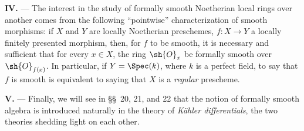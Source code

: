 \begin{env}[19.0.2]
\medskip\noindent\textbf{IV.} ---
The interest in the study of formally smooth Noetherian local rings over another comes from the following ``pointwise'' characterization of smooth morphisms:
if $X$ and $Y$ are locally Noetherian preschemes, $f:X\to Y$ a locally finitely presented morphism, then, for $f$ to be smooth, it is necessary and sufficient that for every $x\in X$, the ring $\sh{O}_x$ be formally smooth over $\sh{O}_{f(x)}$.
In particular, if $Y=\Spec(k)$, where $k$ is a perfect field, to say that $f$ is smooth is equivalent to saying that $X$ is a \emph{regular} prescheme.

\medskip\noindent\textbf{V.} ---
Finally, we will see in \S\S~20, 21, and 22 that the notion of formally smooth algebra is introduced naturally in the theory of \emph{K\"ahler differentials}, the two theories shedding light on each other.
\end{env}


